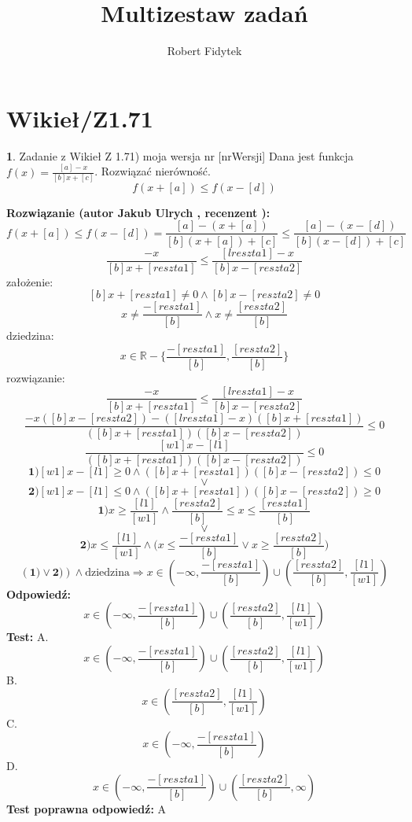 \documentclass[12pt, a4paper]{article}
\title{Multizestaw zadań}
\author{Robert Fidytek}
\date{}
\theoremstyle{definition} %
\newtheorem{zad}{}
\newcommand{\kategoria}[1]{\section{#1}} %
\newcommand{\zadStart}[1]{\begin{zad}#1\newline} %
\newcommand{\zadStop}{\end{zad}}   %
\newcommand{\rozwStart}[2]{\noindent \textbf{Rozwiązanie (autor #1 , recenzent #2): }\newline} %
\newcommand{\rozwStop}{\newline}                                            %
\newcommand{\odpStart}{\noindent \textbf{Odpowiedź:}\newline}    %
\newcommand{\odpStop}{\newline}                                             %
\newcommand{\testStart}{\noindent \textbf{Test:}\newline} %
\newcommand{\testStop}{\newline} %
\newcommand{\kluczStart}{\noindent \textbf{Test poprawna odpowiedź:}\newline} %
\newcommand{\kluczStop}{\newline} %
\begin{document}
\maketitle


\kategoria{Wikieł/Z1.71}
\zadStart{Zadanie z Wikieł Z 1.71) moja wersja nr [nrWersji]}
Dana jest funkcja $f(x)=\frac{[a]-x}{[b]x+[c]}$. Rozwiązać nierówność.
$$f(x+[a])\leq f(x-[d])$$
\zadStop
\rozwStart{Jakub Ulrych}{}
$$f(x+[a])\leq f(x-[d])=\frac{[a]-(x+[a])}{[b](x+[a])+[c]}\leq\frac{[a]-(x-[d])}{[b](x-[d])+[c]}$$
$$\frac{-x}{[b]x+[reszta1]}\leq\frac{[lreszta1]-x}{[b]x-[reszta2]}$$
założenie:$$[b]x+[reszta1]\neq0 \land [b]x-[reszta2]\neq0$$
$$x\neq\frac{-[reszta1]}{[b]} \land x\neq\frac{[reszta2]}{[b]}$$
dziedzina:$$x\in\mathbb{R}-\{\frac{-[reszta1]}{[b]},\frac{[reszta2]}{[b]}\}$$
rozwiązanie:$$\frac{-x}{[b]x+[reszta1]}\leq\frac{[lreszta1]-x}{[b]x-[reszta2]}$$
$$\frac{-x([b]x-[reszta2])-([lreszta1]-x)([b]x+[reszta1])}{([b]x+[reszta1])([b]x-[reszta2])}\leq0$$
$$\frac{[w1]x-[l1]}{([b]x+[reszta1])([b]x-[reszta2])}\leq0$$
$$\textbf{1)}[w1]x-[l1]\geq0 \land ([b]x+[reszta1])([b]x-[reszta2])\leq0$$ $$\vee$$ $$\textbf{2)}[w1]x-[l1]\leq0 \land ([b]x+[reszta1])([b]x-[reszta2])\geq0$$
$$\textbf{1)} x\geq\frac{[l1]}{[w1]}\land \frac{[reszta2]}{[b]}\leq x\leq\frac{[reszta1]}{[b]}$$ $$\vee$$
$$\textbf{2)}x\leq\frac{[l1]}{[w1]}\land \big(x\leq\frac{-[reszta1]}{[b]}\vee x\geq\frac{[reszta2]}{[b]}\big)$$
$$(\textbf{1)}\vee\textbf{2)})\land\text{dziedzina}\Rightarrow x\in(-\infty,\frac{-[reszta1]}{[b]})\cup(\frac{[reszta2]}{[b]},\frac{[l1]}{[w1]})$$
\rozwStop
\odpStart
$$x\in(-\infty,\frac{-[reszta1]}{[b]})\cup(\frac{[reszta2]}{[b]},\frac{[l1]}{[w1]})$$
\odpStop
\testStart
A.$$x\in(-\infty,\frac{-[reszta1]}{[b]})\cup(\frac{[reszta2]}{[b]},\frac{[l1]}{[w1]})$$
B.$$x\in(\frac{[reszta2]}{[b]},\frac{[l1]}{[w1]})$$
C.$$x\in(-\infty,\frac{-[reszta1]}{[b]})$$
D.$$x\in(-\infty,\frac{-[reszta1]}{[b]})\cup(\frac{[reszta2]}{[b]},\infty)$$
\testStop
\kluczStart
A
\kluczStop
\end{document}
